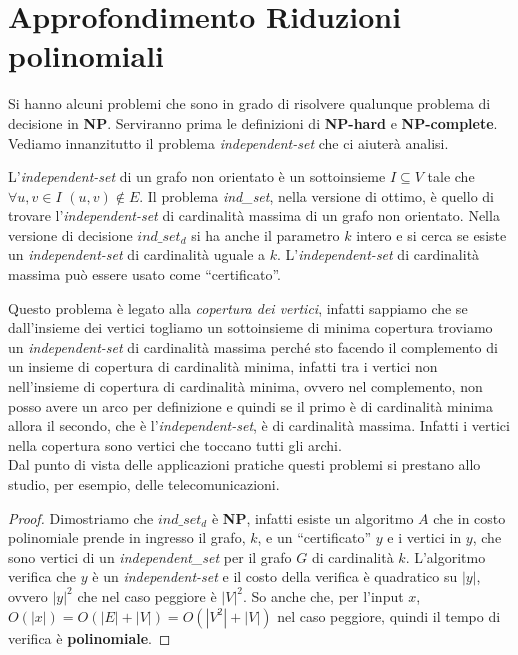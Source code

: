 \section{Approfondimento Riduzioni polinomiali}
			Si hanno alcuni problemi che sono in grado di risolvere qualunque problema di
			decisione in \textbf{NP}. Serviranno prima le definizioni di \textbf{NP-hard} e
			\textbf{NP-complete}.\\
			Vediamo innanzitutto il problema \textit{independent-set} che ci aiuterà
			analisi.
			\begin{definizione}
				L'\textit{independent-set } di un grafo non orientato è un sottoinsieme
				$I\subseteq V$ tale che $\forall u,v\in I$ $(u,v)\not\in E$. Il problema
				\textit{ind\_set}, nella versione di ottimo, è quello di trovare
				l'\textit{independent-set} di cardinalità massima di un grafo non
				orientato. Nella versione di decisione $ind\_set_d$ si ha anche il parametro
				$k$ intero e si cerca se esiste un \textit{independent-set} di cardinalità
				uguale a $k$. L'\textit{independent-set} di cardinalità massima può essere
				usato come ``certificato''.
			\end{definizione}
			Questo problema è legato alla \textit{copertura dei vertici}, infatti sappiamo
			che se dall'insieme dei vertici togliamo un sottoinsieme di minima copertura
			troviamo un \textit{independent-set} di cardinalità massima perché sto facendo
			il complemento di un insieme di copertura di cardinalità minima, infatti tra i
			vertici non nell'insieme di copertura di cardinalità minima, ovvero nel
			complemento, non posso avere un arco per definizione e quindi se il primo è di
			cardinalità minima allora il secondo, che è l'\textit{independent-set}, è di
			cardinalità massima. Infatti i vertici nella copertura sono vertici che toccano
			tutti gli archi.\\
			Dal punto di vista delle applicazioni pratiche questi problemi si prestano allo
			studio, per esempio, delle telecomunicazioni.
			\begin{proof}
				Dimostriamo che $ind\_set_d$ è \textbf{NP}, infatti esiste un algoritmo $A$
				che in costo polinomiale prende in ingresso il grafo, $k$, e un
				``certificato'' $y$ e i vertici in $y$, che sono vertici di un
				\textit{independent\_set} per il grafo $G$ di cardinalità $k$. L'algoritmo
				verifica che $y$ è un \textit{independent-set} e il costo della verifica è
				quadratico su $|y|$, ovvero $|y|^2$ che nel caso peggiore è $|V|^2$. So anche
				che, per l'input $x$, $O(|x|)=O(|E|+|V|)=O(|V^2|+|V|)$ nel caso peggiore,
				quindi il tempo di verifica è \textbf{polinomiale}.
			\end{proof}
